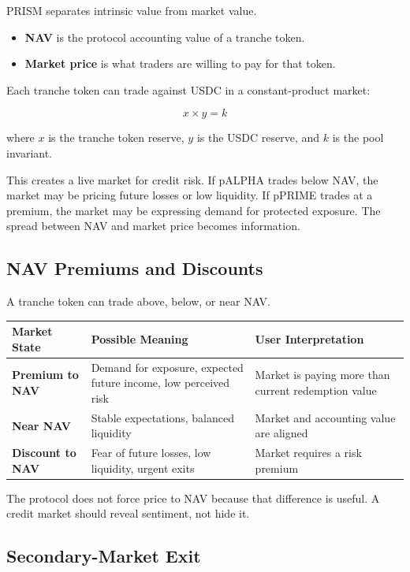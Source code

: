 \documentclass[11pt]{article}
\begin{document}
PRISM separates intrinsic value from market value.

\begin{itemize}
  \item \textbf{NAV} is the protocol accounting value of a tranche token.
  \item \textbf{Market price} is what traders are willing to pay for that token.
\end{itemize}

Each tranche token can trade against USDC in a constant-product market:

\[
x \times y = k
\]

where \(x\) is the tranche token reserve, \(y\) is the USDC reserve, and \(k\) is
the pool invariant.

This creates a live market for credit risk. If pALPHA trades below NAV, the
market may be pricing future losses or low liquidity. If pPRIME trades at a
premium, the market may be expressing demand for protected exposure. The spread
between NAV and market price becomes information.

\subsection{NAV Premiums and Discounts}

A tranche token can trade above, below, or near NAV.

\begin{center}
\begin{tabular}{>{\bfseries}p{}p{}p{}}
\toprule
Market State & Possible Meaning & User Interpretation \\
\midrule
Premium to NAV & Demand for exposure, expected future income, low perceived risk & Market is paying more than current redemption value \\
Near NAV & Stable expectations, balanced liquidity & Market and accounting value are aligned \\
Discount to NAV & Fear of future losses, low liquidity, urgent exits & Market requires a risk premium \\
\bottomrule
\end{tabular}
\end{center}

The protocol does not force price to NAV because that difference is useful. A
credit market should reveal sentiment, not hide it.

\subsection{Secondary-Market Exit}
\end{document}
